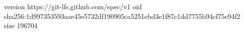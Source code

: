 version https://git-lfs.github.com/spec/v1
oid sha256:1d997353593aae45e5732df190905ca5251ebd3e1f87c1dd7755b94cf75e94f2
size 196704
